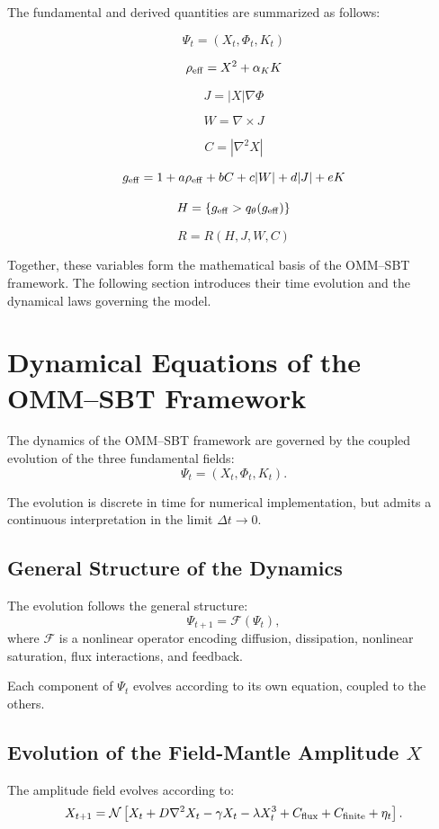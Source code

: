 \documentclass[11pt]{article}
\begin{document}
The fundamental and derived quantities are summarized as follows:

\[
\Psi_t = (X_t,\Phi_t,K_t)
\]

\[
\rho_{\rm eff} = X^2 + \alpha_K K
\]

\[
J = |X|\nabla\Phi
\]

\[
W = \nabla \times J
\]

\[
C = |\nabla^2X|
\]

\[
g_{\rm eff}=1+a\rho_{\rm eff}+bC+c|W|+d|J|+eK
\]

\[
H=\{g_{\rm eff}>q_\theta(g_{\rm eff})\}
\]

\[
R=R(H,J,W,C)
\]

Together, these variables form the mathematical basis of the OMM--SBT framework. The following section introduces their time evolution and the dynamical laws governing the model.

\section{Dynamical Equations of the OMM--SBT Framework}

The dynamics of the OMM--SBT framework are governed by the coupled evolution of the three fundamental fields:
\[
\Psi_t = (X_t,\Phi_t,K_t).
\]

The evolution is discrete in time for numerical implementation, but admits a continuous interpretation in the limit $\Delta t \to 0$.

\subsection{General Structure of the Dynamics}

The evolution follows the general structure:
\begin{equation}
\Psi_{t+1} = \mathcal{F}(\Psi_t),
\end{equation}
where $\mathcal{F}$ is a nonlinear operator encoding diffusion, dissipation, nonlinear saturation, flux interactions, and feedback.

Each component of $\Psi_t$ evolves according to its own equation, coupled to the others.

\subsection{Evolution of the Field-Mantle Amplitude $X$}

The amplitude field evolves according to:
\begin{equation}
X_{t+1}
=
\mathcal{N}
\left[
X_t
+ D \nabla^2 X_t
- \gamma X_t
- \lambda X_t^3
+ C_{\rm flux}
+ C_{\rm finite}
+ \eta_t
\right].
\end{equation}
\end{document}
